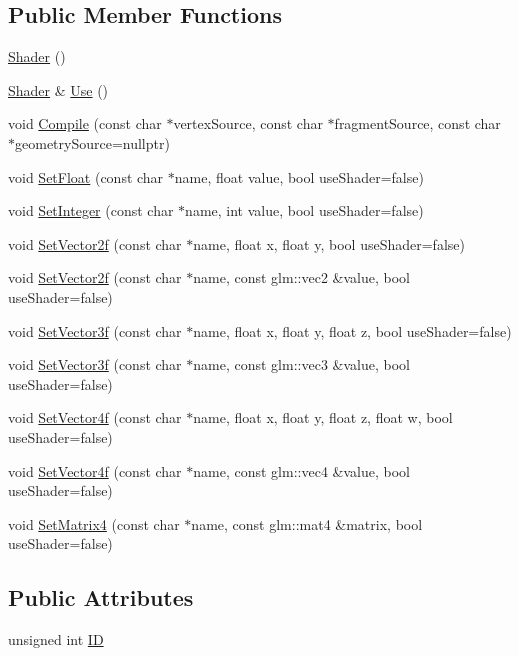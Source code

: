 \subsection*{Public Member Functions}
\begin{DoxyCompactItemize}
\item 
\hyperlink{classShader_a0d654ebaca4e0555197c0724c6d30610}{Shader} ()
\item 
\hyperlink{classShader}{Shader} \& \hyperlink{classShader_a02292f4fdae284b29169db5da29e519a}{Use} ()
\item 
void \hyperlink{classShader_ace30758935fc09126ec99f5b602cb18f}{Compile} (const char $\ast$vertex\+Source, const char $\ast$fragment\+Source, const char $\ast$geometry\+Source=nullptr)
\item 
void \hyperlink{classShader_a90a74282cd77e51812cd2c0ed0eb5cad}{Set\+Float} (const char $\ast$name, float value, bool use\+Shader=false)
\item 
void \hyperlink{classShader_aac20695848a1a8a283e23d36b0557c20}{Set\+Integer} (const char $\ast$name, int value, bool use\+Shader=false)
\item 
void \hyperlink{classShader_ae5994e58f1eec3278b61655ef2a23b4f}{Set\+Vector2f} (const char $\ast$name, float x, float y, bool use\+Shader=false)
\item 
void \hyperlink{classShader_adf66248417fdee81d48fdd63bbee6805}{Set\+Vector2f} (const char $\ast$name, const glm\+::vec2 \&value, bool use\+Shader=false)
\item 
void \hyperlink{classShader_ac1dbbe3e0134b04c9decf1974252f07b}{Set\+Vector3f} (const char $\ast$name, float x, float y, float z, bool use\+Shader=false)
\item 
void \hyperlink{classShader_a996865767a7485cb63bbd979bb1bc252}{Set\+Vector3f} (const char $\ast$name, const glm\+::vec3 \&value, bool use\+Shader=false)
\item 
void \hyperlink{classShader_a9fd94ef003bab74c968ebde2c9c542b4}{Set\+Vector4f} (const char $\ast$name, float x, float y, float z, float w, bool use\+Shader=false)
\item 
void \hyperlink{classShader_a6bd077475ad23d4eccaf0d4c695c668a}{Set\+Vector4f} (const char $\ast$name, const glm\+::vec4 \&value, bool use\+Shader=false)
\item 
void \hyperlink{classShader_a8bfcef4683f9cba1cfc955b869ee258a}{Set\+Matrix4} (const char $\ast$name, const glm\+::mat4 \&matrix, bool use\+Shader=false)
\end{DoxyCompactItemize}
\subsection*{Public Attributes}
\begin{DoxyCompactItemize}
\item 
unsigned int \hyperlink{classShader_a142a08b6fbdfc982d82ca10ee0b0f38d}{ID}
\end{DoxyCompactItemize}
